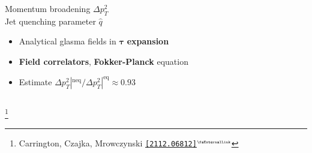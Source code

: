 \documentclass[aspectratio=169,11pt,usenames,dvipsnames]{beamer}
\renewcommand{\thefootnote}{\color{customblue}\faPaperPlaneO}
\newcommand\blfootnote[1]{%
  \begingroup
  \renewcommand\thefootnote{}\footnote{#1}%
  \addtocounter{footnote}{-1}%
  \endgroup
}
\begin{document}
\begin{frame}[t]
\begin{columns}[onlytextwidth,t]
\begin{center}
            {\Large\color{palteal} Momentum broadening $\Delta p_T^2$ \\[5pt] Jet quenching parameter $\hat{q}$  \\[10pt]}
            \footnotesize
                \begin{itemize}
                    \item {\color{lightgray}Analytical glasma fields in $\boldsymbol{\tau}$ \textbf{expansion}}
                    \item {\color{lightgray} {\bfseries Field correlators}, {\bfseries Fokker-Planck} equation}
                    \item {\color{lightgray} Estimate $\Delta p_T^2|^\mathrm{neq}/\Delta p_T^2|^\mathrm{eq}\approx 0.93$}
                \end{itemize}
        \end{center}
    \end{columns}
    \blfootnote{\scriptsize Carrington, Czajka, Mrowczynski \href{https://arxiv.org/abs/2112.06812}{\color{palgold}\texttt{[2112.06812]}$^\text{\tiny\faExternalLink}$}}
\end{frame}


\end{document}

